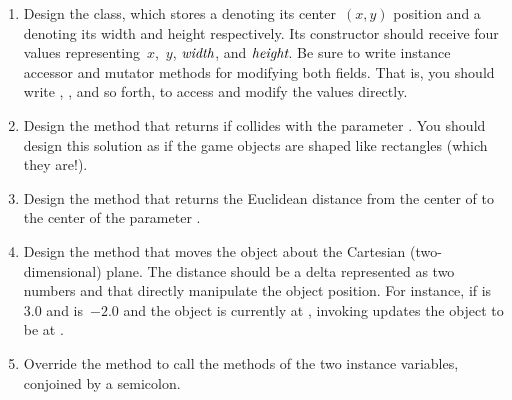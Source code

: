 \begin{enumerate}[label=(\alph*)]
    \item Design the  class, which stores a  denoting its center~$(x, y)$ position and a  denoting its width and height respectively. Its constructor should receive four  values representing~$x$,~$y$, $\emph{width}$, and $\emph{height}$. Be sure to write instance accessor and mutator methods for modifying both fields. That is, you should write , , and so forth, to access and modify the  values directly. 

    \item Design the  method that returns if   collides with the parameter . You should design this solution as if the game objects are shaped like rectangles (which they are!).

    \item Design the  method that returns the Euclidean distance from the center of   to the center of the parameter . 

    \item Design the  method that moves the object about the Cartesian (two-dimensional) plane. The distance should be a delta represented as two  numbers  and  that directly manipulate the object position. For instance, if  is~$3.0$ and  is~$-2.0$ and the object is currently at , invoking  updates the object to be at .

    \item Override the  method to call the  methods of the two instance variables, conjoined by a semicolon.
\end{enumerate}

